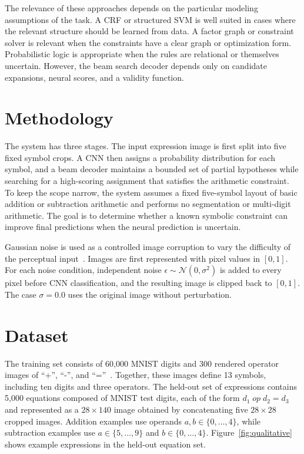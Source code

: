 \documentclass[12pt]{article}
\begin{document}
The relevance of these approaches depends on the particular modeling assumptions of the task. A CRF or structured SVM is well suited in cases where the relevant structure should be learned from data. A factor graph or constraint solver is relevant when the constraints have a clear graph or optimization form. Probabilistic logic is appropriate when the rules are relational or themselves uncertain. However, the beam search decoder depends only on candidate expansions, neural scores, and a validity function.

\section{Methodology}
The system has three stages. The input expression image is first split into five fixed symbol crops. A CNN then assigns a probability distribution for each symbol, and a beam decoder maintains a bounded set of partial hypotheses while searching for a high-scoring assignment that satisfies the arithmetic constraint. To keep the scope narrow, the system assumes a fixed five-symbol layout of basic addition or subtraction arithmetic and performs no segmentation or multi-digit arithmetic. The goal is to determine whether a known symbolic constraint can improve final predictions when the neural prediction is uncertain.

Gaussian noise is used as a controlled image corruption to vary the difficulty of the perceptual input~\cite{hendrycks2019}. Images are first represented with pixel values in $[0,1]$. For each noise condition, independent noise $\epsilon \sim \mathcal{N}(0,\sigma^2)$ is added to every pixel before CNN classification, and the resulting image is clipped back to $[0,1]$. The case $\sigma=0.0$ uses the original image without perturbation.

\section{Dataset}
The training set consists of 60{,}000 MNIST digits and 300 rendered operator images of ``+'', ``-'', and ``=''~\cite{lecun1998}. Together, these images define 13 symbols, including ten digits and three operators. The held-out set of expressions contains 5{,}000 equations composed of MNIST test digits, each of the form $d_1 \; op \; d_2 = d_3$ and represented as a $28 \times 140$ image obtained by concatenating five $28 \times 28$ cropped images. Addition examples use operands $a,b \in \{0,\dots,4\}$, while subtraction examples use $a \in \{5,\dots,9\}$ and $b \in \{0,\dots,4\}$. Figure~\ref{fig:qualitative} shows example expressions in the held-out equation set.
\end{document}
